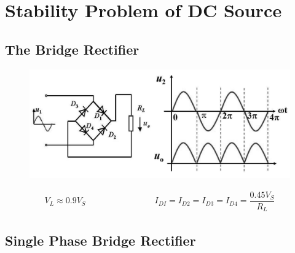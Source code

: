 \chapter{Stability Problem of DC Source}

\section{The Bridge Rectifier}

\begin{figure}[H]
  \centering
  \includegraphics[width=0.8\linewidth]{figures/BridgedRectifierCircuit}
\end{figure}

\begin{equation*}
  \begin{aligned}
    V_L \approx 0.9 V_S \quad\quad \quad\quad \quad\quad \quad\quad  I_{DI} = I_{D2} = I_{D3} = I_{D4} = \dfrac{0.45 V_S}{R_L} 
  \end{aligned}
\end{equation*}

\section{Single Phase Bridge Rectifier}

